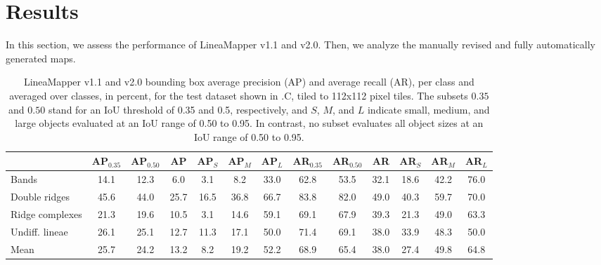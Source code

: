 \section{Results}
In this section, we assess the performance of LineaMapper v1.1 and v2.0. Then, we analyze the manually revised and fully automatically generated maps.

\begin{table*}%
\centering
\caption{LineaMapper v1.1 and v2.0 bounding box average precision (AP) and average recall (AR), per class and averaged over classes, in percent, for the test dataset shown in .C, tiled to 112x112 pixel tiles. The subsets $0.35$ and $0.50$ stand for an IoU threshold of 0.35 and 0.5, respectively, and $S$, $M$, and $L$ indicate small, medium, and large objects evaluated at an IoU range of 0.50 to 0.95. In contrast, no subset evaluates all object sizes at an IoU range of 0.50 to 0.95.}
\label{tab:bbox_metrics_v1.1_112x112}
\begin{tabular}{@{}lcccccc|cccccc@{}}
\toprule
 & AP$_{0.35}$ & AP$_{0.50}$ & AP & AP$_S$ & AP$_M$ & AP$_L$ & AR$_{0.35}$ & AR$_{0.50}$ & AR & AR$_S$ & AR$_M$ & AR$_L$ \\ \midrule
Bands & 14.1 & 12.3 & 6.0 & 3.1 & 8.2 & 33.0 & 62.8 & 53.5 & 32.1 & 18.6 & 42.2 & 76.0 \\
Double ridges & 45.6 & 44.0 & 25.7 & 16.5 & 36.8 & 66.7 & 83.8 & 82.0 & 49.0 & 40.3 & 59.7 & 70.0 \\
Ridge complexes & 21.3 & 19.6 & 10.5 & 3.1 & 14.6 & 59.1 & 69.1 & 67.9 & 39.3 & 21.3 & 49.0 & 63.3 \\
Undiff. lineae & 26.1 & 25.1 & 12.7 & 11.3 & 17.1 & 50.0 & 71.4 & 69.1 & 38.0 & 33.9 & 48.3 & 50.0 \\ \midrule
Mean & 25.7 & 24.2 & 13.2 & 8.2 & 19.2 & 52.2 & 68.9 & 65.4 & 38.0 & 27.4 & 49.8 & 64.8 \\ \bottomrule
\end{tabular}
\end{table*}


